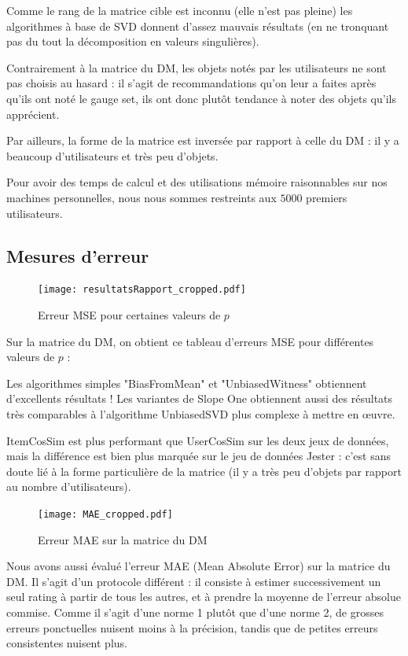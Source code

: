 \documentclass[11pt, openany, a4paper]{article}
\begin{document}
		Comme le rang de la matrice cible est inconnu (elle n'est pas pleine) les algorithmes à base de SVD donnent d'assez mauvais résultats (en ne tronquant pas du tout la décomposition en valeurs singulières).
		
		Contrairement à la matrice du DM, les objets notés par les utilisateurs ne sont pas choisis au hasard : il s'agit de recommandations qu'on leur a faites après qu'ils ont noté le gauge set, ils ont donc plutôt tendance à noter des objets qu'ils apprécient.
		
		Par ailleurs, la forme de la matrice est inversée par rapport à celle du DM : il y a beaucoup d'utilisateurs et très peu d'objets.
		
		Pour avoir des temps de calcul et des utilisations mémoire raisonnables sur nos machines personnelles, nous nous sommes restreints aux $5000$ premiers utilisateurs.
	
	\subsection{Mesures d'erreur}
	
		\begin{figure}[ht!]
			\centering
			\texttt{[image: resultatsRapport\_cropped.pdf]}
			\caption{Erreur MSE pour certaines valeurs de $p$}
		\end{figure}
		Sur la matrice du DM, on obtient ce tableau d'erreurs MSE pour différentes valeurs de $p$ :
		
		
		Les algorithmes simples "BiasFromMean" et "UnbiasedWitness" obtiennent d'excellents résultats ! Les variantes de Slope One obtiennent aussi des résultats très comparables à l'algorithme UnbiasedSVD plus complexe à mettre en œuvre.
		
		ItemCosSim est plus performant que UserCosSim sur les deux jeux de données, mais la différence est bien plus marquée sur le jeu de données Jester : c'est sans doute lié à la forme particulière de la matrice (il y a très peu d'objets par rapport au nombre d'utilisateurs).
		
		\begin{figure}[ht!]
			\centering
			\texttt{[image: MAE\_cropped.pdf]}
			\caption{Erreur MAE sur la matrice du DM}
		\end{figure}
		
		Nous avons aussi évalué l'erreur MAE (Mean Absolute Error) sur la matrice du DM. Il s'agit d'un protocole différent : il consiste à estimer successivement un seul rating à partir de tous les autres, et à prendre la moyenne de l'erreur absolue commise. Comme il s'agit d'une norme 1 plutôt que d'une norme 2, de grosses erreurs ponctuelles nuisent moins à la précision, tandis que de petites erreurs consistentes nuisent plus.
		
\end{document}
